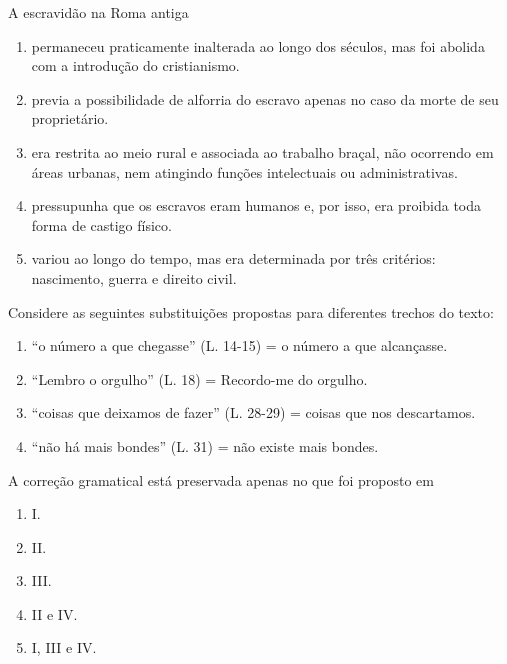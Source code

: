 \documentclass[twocolumn,landscape]{amsart}
\begin{document}
\begin{questao}
  A escravidão na Roma antiga
  \begin{enumerate}[\bf a.]
    \item permaneceu praticamente inalterada ao longo dos séculos, mas
    foi abolida com a introdução do cristianismo.
    \item previa a possibilidade de alforria do escravo apenas no caso
    da morte de seu proprietário.
    \item era restrita ao meio rural e associada ao trabalho braçal, não
    ocorrendo em áreas urbanas, nem atingindo funções intelectuais ou
    administrativas.
    \item pressupunha que os escravos eram humanos e, por isso, era
    proibida toda forma de castigo físico.
    \item variou ao longo do tempo, mas era determinada por três
    critérios: nascimento, guerra e direito civil. %
  \end{enumerate}
\end{questao}
\clearpage

\begin{questao}
  Considere as seguintes substituições propostas para diferentes trechos
  do texto:
  \begin{enumerate}[\bf I.]
    \item ``o número a que chegasse'' (L. 14-15) = o número a
    que alcançasse.
    \item ``Lembro o orgulho'' (L. 18) = Recordo-me do
    orgulho.
    \item ``coisas que deixamos de fazer'' (L. 28-29) = coisas
    que nos descartamos.
    \item ``não há mais bondes'' (L. 31) = não existe mais
    bondes.
  \end{enumerate}
  A correção gramatical está preservada apenas no que foi proposto em
  \begin{enumerate}[\bf a.]
    \item I.
    \item II. %
    \item III.
    \item II e IV.
    \item I, III e IV.
  \end{enumerate}
\end{questao}
\clearpage
\end{document}
